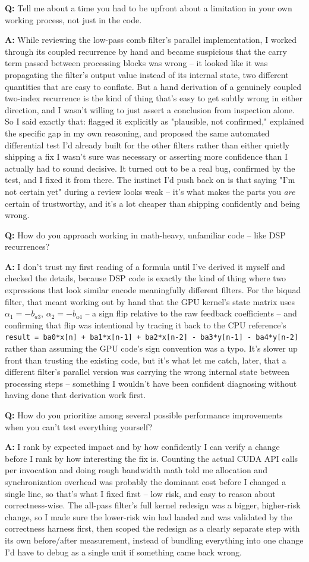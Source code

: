 \documentclass[11pt]{article}
\newcommand{\Q}[1]{\vspace{0.6em}\noindent\textbf{\textcolor{blue!60!black}{Q:}} #1\par}
\newcommand{\A}[1]{\noindent\textbf{A:} #1\par}
\begin{document}
\Q{Tell me about a time you had to be upfront about a limitation in your own working process, not just in the code.}
\A{While reviewing the low-pass comb filter's parallel implementation, I worked through its coupled recurrence by hand and became suspicious that the carry term passed between processing blocks was wrong -- it looked like it was propagating the filter's output value instead of its internal state, two different quantities that are easy to conflate. But a hand derivation of a genuinely coupled two-index recurrence is the kind of thing that's easy to get subtly wrong in either direction, and I wasn't willing to just assert a conclusion from inspection alone. So I said exactly that: flagged it explicitly as "plausible, not confirmed," explained the specific gap in my own reasoning, and proposed the same automated differential test I'd already built for the other filters rather than either quietly shipping a fix I wasn't sure was necessary or asserting more confidence than I actually had to sound decisive. It turned out to be a real bug, confirmed by the test, and I fixed it from there. The instinct I'd push back on is that saying "I'm not certain yet" during a review looks weak -- it's what makes the parts you \emph{are} certain of trustworthy, and it's a lot cheaper than shipping confidently and being wrong.}

\Q{How do you approach working in math-heavy, unfamiliar code -- like DSP recurrences?}
\A{I don't trust my first reading of a formula until I've derived it myself and checked the details, because DSP code is exactly the kind of thing where two expressions that look similar encode meaningfully different filters. For the biquad filter, that meant working out by hand that the GPU kernel's state matrix uses $\alpha_1=-b_{a3}$, $\alpha_2=-b_{a4}$ -- a sign flip relative to the raw feedback coefficients -- and confirming that flip was intentional by tracing it back to the CPU reference's \texttt{result = ba0*x[n] + ba1*x[n-1] + ba2*x[n-2] - ba3*y[n-1] - ba4*y[n-2]} rather than assuming the GPU code's sign convention was a typo. It's slower up front than trusting the existing code, but it's what let me catch, later, that a different filter's parallel version was carrying the wrong internal state between processing steps -- something I wouldn't have been confident diagnosing without having done that derivation work first.}

\Q{How do you prioritize among several possible performance improvements when you can't test everything yourself?}
\A{I rank by expected impact and by how confidently I can verify a change before I rank by how interesting the fix is. Counting the actual CUDA API calls per invocation and doing rough bandwidth math told me allocation and synchronization overhead was probably the dominant cost before I changed a single line, so that's what I fixed first -- low risk, and easy to reason about correctness-wise. The all-pass filter's full kernel redesign was a bigger, higher-risk change, so I made sure the lower-risk win had landed and was validated by the correctness harness first, then scoped the redesign as a clearly separate step with its own before/after measurement, instead of bundling everything into one change I'd have to debug as a single unit if something came back wrong.}
\end{document}
